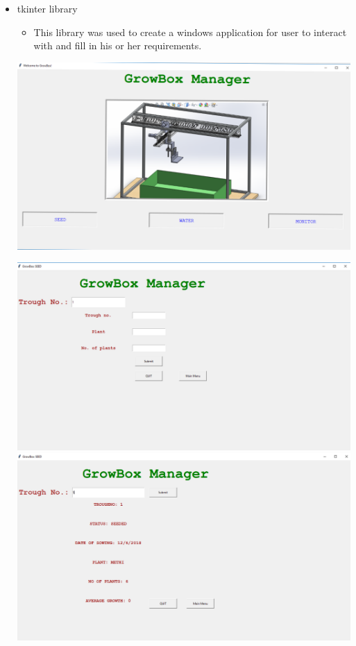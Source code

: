 \documentclass[a4paper,12pt,oneside]{book}
\begin{document}
\begin{itemize}
        \begin{itemize}
            \item tkinter library 
                \begin{itemize}
                    \item This library was used to create a windows application for user to interact with and fill in his or her requirements.  
                \end{itemize}
                \begin{center}
                    \includegraphics[scale=.3]{main_menu.png}
                \end{center}
                \begin{center}
                    \includegraphics[scale=0.3]{seed_without_data.png}
                    \includegraphics[scale=0.3]{seed_with_data.png}

\end{center}
\end{itemize}
\end{itemize}
\end{document}
